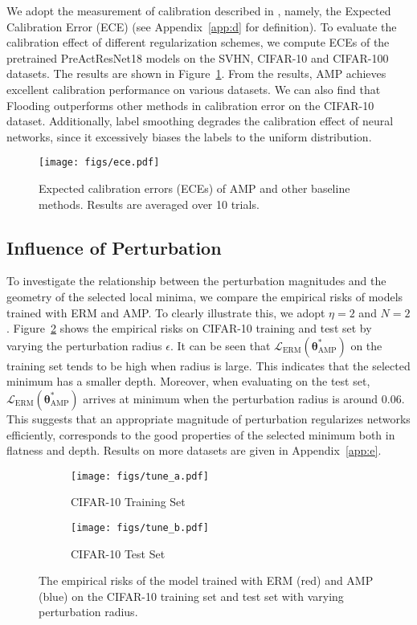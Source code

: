 \documentclass[final]{cvpr}
\begin{document}
We adopt the measurement of calibration described in \cite{guo2017calibration}, namely, the Expected Calibration Error (ECE) (see Appendix~\ref{app:d} for definition). To evaluate the calibration effect of different regularization schemes, we compute ECEs of the pretrained PreActResNet18 models on the SVHN, CIFAR-10 and CIFAR-100 datasets. The results are shown in Figure~\ref{fig:ece}. From the results, AMP achieves excellent calibration performance on various datasets. We can also find that Flooding outperforms other methods in calibration error on the CIFAR-10 dataset. Additionally, label smoothing degrades the calibration effect of neural networks, since it excessively biases the labels to the uniform distribution.

\begin{figure}[t]
\centering
\texttt{[image: figs/ece.pdf]}
\caption{Expected calibration errors (ECEs) of AMP and other baseline methods. Results are averaged over 10 trials.}
\label{fig:ece}
\end{figure}

\subsection{Influence of Perturbation}\label{sec:influence}

To investigate the relationship between the perturbation magnitudes and the geometry of the selected local minima, we compare the empirical risks of models trained with ERM and AMP. To clearly illustrate this, we adopt $\eta=2$ and $N=2$. Figure~\ref{fig:tune} shows the empirical risks on CIFAR-10 training and test set by varying the perturbation radius $\epsilon$. It can be seen that $\mathcal{L}_\mathrm{ERM}(\boldsymbol{\theta}^\ast_\mathrm{AMP})$ on the training set tends to be high when radius is large. This indicates that the selected minimum has a smaller depth. Moreover, when evaluating on the test set, $\mathcal{L}_\mathrm{ERM}(\boldsymbol{\theta}^\ast_\mathrm{AMP})$ arrives at minimum when the perturbation radius is around $0.06$. This suggests that an appropriate magnitude of perturbation regularizes networks efficiently, corresponds to the good properties of the selected minimum both in flatness and depth. Results on more datasets are given in Appendix~\ref{app:e}.

\begin{figure}[t]
\centering
\begin{subfigure}{0.49\columnwidth}\centering \captionsetup{width=0.88\columnwidth}\texttt{[image: figs/tune\_a.pdf]}\caption{CIFAR-10 Training Set}\end{subfigure}\begin{subfigure}{0.49\columnwidth}\centering \captionsetup{width=0.88\columnwidth}\texttt{[image: figs/tune\_b.pdf]}\caption{CIFAR-10 Test Set}\end{subfigure}\caption{The empirical risks of the model trained with ERM (red) and AMP (blue) on the CIFAR-10 training set and test set with varying perturbation radius.}
\label{fig:tune}
\end{figure}
\end{document}
